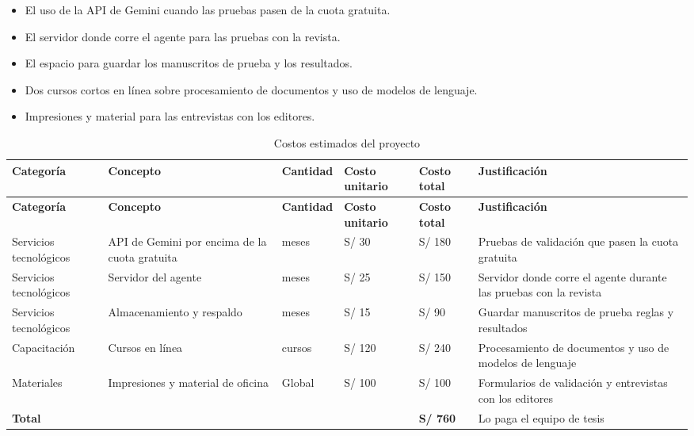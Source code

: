 \begin{itemize}
  \item El uso de la API de Gemini cuando las pruebas pasen de la cuota gratuita.
  \item El servidor donde corre el agente para las pruebas con la revista.
  \item El espacio para guardar los manuscritos de prueba y los resultados.
  \item Dos cursos cortos en línea sobre procesamiento de documentos y uso de modelos de lenguaje.
  \item Impresiones y material para las entrevistas con los editores.
\end{itemize}

{\scriptsize
\begin{longtable}{@{}>{\raggedright\arraybackslash}p{}>{\raggedright\arraybackslash}p{}>{\raggedright\arraybackslash}p{}>{\raggedright\arraybackslash}p{}>{\raggedright\arraybackslash}p{}>{\raggedright\arraybackslash}p{}@{}}
\caption{Costos estimados del proyecto}\label{tab:2-5}\\
\toprule
\textbf{Categoría} & \textbf{Concepto} & \textbf{Cantidad} & \textbf{Costo unitario} & \textbf{Costo total} & \textbf{Justificación} \\
\midrule
\endfirsthead
\toprule
\textbf{Categoría} & \textbf{Concepto} & \textbf{Cantidad} & \textbf{Costo unitario} & \textbf{Costo total} & \textbf{Justificación} \\
\midrule
\endhead
\bottomrule
\endfoot
\endlastfoot
Servicios tecnológicos & API de Gemini por encima de la cuota gratuita & 6 meses & S/ 30 & S/ 180 & Pruebas de validación que pasen la cuota gratuita \\
Servicios tecnológicos & Servidor del agente & 6 meses & S/ 25 & S/ 150 & Servidor donde corre el agente durante las pruebas con la revista \\
Servicios tecnológicos & Almacenamiento y respaldo & 6 meses & S/ 15 & S/ 90 & Guardar manuscritos de prueba reglas y resultados \\
Capacitación & Cursos en línea & 2 cursos & S/ 120 & S/ 240 & Procesamiento de documentos y uso de modelos de lenguaje \\
Materiales & Impresiones y material de oficina & Global & S/ 100 & S/ 100 & Formularios de validación y entrevistas con los editores \\
\textbf{Total} &  &  &  & \textbf{S/ 760} & Lo paga el equipo de tesis \\
\end{longtable}
}

